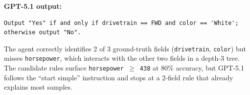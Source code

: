 \documentclass{article} %
\begin{document}
\noindent\textbf{GPT-5.1 output:}
{\small
\begin{verbatim}
Output "Yes" if and only if drivetrain == FWD and color == 'White';
otherwise output "No".
\end{verbatim}
}

\noindent The agent correctly identifies 2 of 3 ground-truth fields (\texttt{drivetrain}, \texttt{color}) but misses \texttt{horsepower}, which interacts with the other two fields in a depth-3 tree. The candidate rules surface \texttt{horsepower $\geq$ 438} at 80\% accuracy, but GPT-5.1 follows the ``start simple'' instruction and stops at a 2-field rule that already explains most samples.
\end{document}
